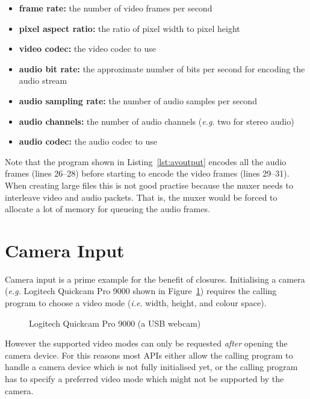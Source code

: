 \documentclass[12pt,a4paper,oneside,openright]{book}
\newcommand{\eg}{\emph{e.g.} }
\newcommand{\ie}{\emph{i.e.} }
\newcommand{\Ie}{That is, }
\newcommand{\fig}[1]{Figure~\ref{fig:#1}}
\newcommand{\lst}[1]{Listing~\ref{lst:#1}}
\begin{document}
\begin{CJK}{UTF8}{}
\begin{itemize}
\item \textbf{frame rate:} the number of video frames per second
\item \textbf{pixel aspect ratio:} the ratio of pixel width to pixel height
\item \textbf{video codec:} the video codec to use
\item \textbf{audio bit rate:} the approximate number of bits per second for encoding the audio stream
\item \textbf{audio sampling rate:} the number of audio samples per second
\item \textbf{audio channels:} the number of audio channels (\eg two for stereo audio)
\item \textbf{audio codec:} the audio codec to use
\end{itemize}
Note that the program shown in \lst{avoutput} encodes all the audio frames (lines 26--28) before starting to encode the video frames (lines 29--31). When creating large files this is not good practise because the muxer needs to interleave video and audio packets. \Ie the muxer would be forced to allocate a lot of memory for queueing the audio frames.

\section{Camera Input}\label{cha:caminput}
Camera input is a prime example for the benefit of closures. Initialising a camera (\eg Logitech Quickcam Pro 9000 shown in \fig{quickcam}) requires the calling program to choose a video mode (\ie width, height, and colour space).
\begin{figure}[htbp]
  \begin{center}
    \caption{Logitech Quickcam Pro 9000 (a USB webcam)\label{fig:quickcam}}
  \end{center}
\end{figure}
However the supported video modes can only be requested \emph{after} opening the camera device. For this reasons most \acp{API} either allow the calling program to handle a camera device which is not fully initialised yet, or the calling program has to specify a preferred video mode which might not be supported by the camera.


\end{CJK}
\end{document}
